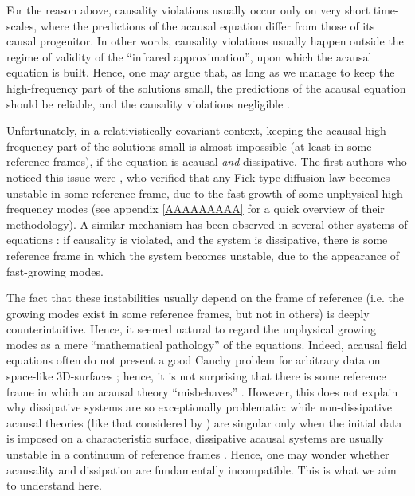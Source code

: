 \documentclass[a4paper, amsfonts, amssymb, amsmath, reprint, showkeys,  twoside, onecolumn,notitlepage,nofootinbib]{revtex4-1}
\theoremstyle{definition}
\theoremstyle{theorem}
\begin{document}
For the reason above, causality violations usually occur only on very short time-scales, where the predictions of the acausal equation differ from those of its causal progenitor. In other words, causality violations usually happen outside the regime of validity of the ``infrared approximation'', upon which the acausal equation is built. Hence, one may argue that, as long as we manage to keep the high-frequency part of the solutions small, the predictions of the acausal equation should be reliable, and the causality violations negligible \cite{Fichera1992,Day1997,PanB2008,Auriault2017}.

Unfortunately, in a relativistically covariant context, keeping the acausal high-frequency part of the solutions small is almost impossible (at least in some reference frames), if the equation is acausal \textit{and} dissipative. The first authors who noticed this issue were \citet{Hiscock_Insatibility_first_order}, who verified that any Fick-type diffusion law becomes unstable in some reference frame, due to the fast growth of some unphysical high-frequency modes (see appendix \ref{AAAAAAAAA} for a quick overview of their methodology). A similar mechanism has been observed in several other systems of equations  \cite{Hishcock1983,OlsonLifsh1990,GerochLindblom1990,
Geroch_Lindblom_1991_causal,Pu2010,Kovtun2019}: 
if causality is violated, and the system is dissipative, there is some reference frame in which the system becomes unstable, due to the appearance of fast-growing modes. 





The fact that these instabilities usually depend on the frame of reference (i.e. the growing modes exist in some reference frames, but not in others) is deeply counterintuitive. Hence, it seemed natural to regard the unphysical growing modes as a mere ``mathematical pathology'' of the equations. Indeed, acausal field equations often do not present a good Cauchy problem for arbitrary data on space-like 3D-surfaces \cite{Susskind1969}; hence, it is not surprising that there is some reference frame in which an acausal theory ``misbehaves'' \cite{BaierRom2008}. However, this does not explain why dissipative systems are so exceptionally problematic: while non-dissipative acausal theories (like that considered by \citet{Susskind1969}) are singular only when the initial data is imposed on a characteristic surface, dissipative acausal systems are usually unstable in a continuum of reference frames \cite{Hiscock_Insatibility_first_order}. Hence, one may wonder whether acausality and dissipation are fundamentally incompatible. This is what we aim to understand here.
\end{document}
